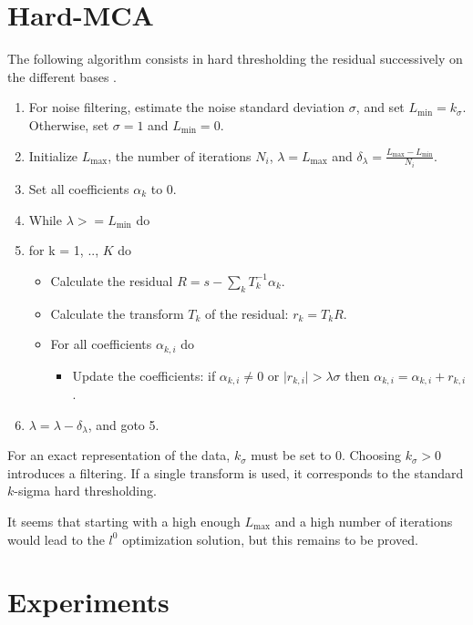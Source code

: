 \section{Hard-MCA}
\label{sect_l0}
The following algorithm consists in hard thresholding the residual 
successively on the different bases \cite{starck:spie01b,starck:sta02_3}. 
\begin{enumerate}
\item For noise filtering, estimate the noise standard deviation $\sigma$,
and set $L_{\min} = k_{\sigma}$. 
Otherwise, set $\sigma=1$ and $L_{\min} = 0$.
\item Initialize $L_{\max}$, the number of iterations $N_i$, 
$\lambda = L_{\max}$ and $\delta_{\lambda} = \frac{L_{\max} - L_{\min}}{N_i}$.
\item Set all coefficients $\alpha_k$ to 0.
\item While $\lambda >= L_{\min}$ do
\item for k = 1, .., $K$ do
\begin{itemize}
\item Calculate the residual $R = s - \sum_k T_k^{-1} \alpha_k$.
\item Calculate the transform $T_k$ of the residual:
$r_k = T_k R$.
\item For all coefficients $\alpha_{k,i}$ do
\begin{itemize}
\item  Update the coefficients:  
 if $\alpha_{k,i} \ne 0$ or $\mid r_{k,i}  \mid > \lambda \sigma$ 
then $\alpha_{k,i}  =  \alpha_{k,i} + r_{k,i}$.
\end{itemize}
\end{itemize}
\item $\lambda = \lambda - \delta_{\lambda} $, and goto 5.
\end{enumerate}
For an exact representation of the data, $k_{\sigma}$ must be set to 0.
Choosing $k_{\sigma} > 0$ introduces a filtering. If a single transform is used,
it corresponds to the standard  $k$-sigma hard thresholding.

It seems that starting with a high enough $L_{\max}$ and a high
number of iterations would lead to the $l^0$ optimization solution,
but this remains to be proved.


\section{Experiments}

